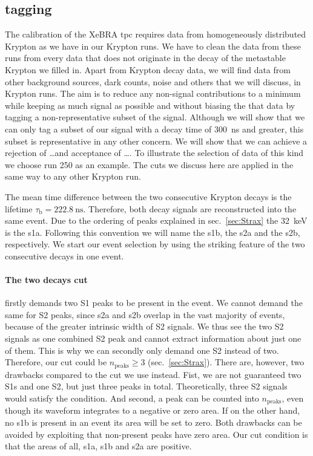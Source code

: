
\FloatBarrier
\subsection{tagging}
\label{ssec:tagging}
\FloatBarrier



The calibration of the XeBRA \gls{tpc} requires data from homogeneously distributed Krypton as we have in our Krypton runs.
We have to clean the data from these runs from every data that does not originate in the decay of the metastable Krypton we filled in.
Apart from Krypton decay data, we will find data from other background sources, dark counts, noise and others that we will discuss, in Krypton runs.
The aim is to reduce any non-signal contributions to a minimum while keeping as much signal as possible and without biasing the that data by tagging a non-representative subset of the signal.
Although we will show that we can only tag a subset of our signal with a decay time of \SI{300}{\nano\s} and greater, this subset is representative in any other concern.
We will show that we can achieve a rejection of \dots and acceptance of \dots.  %
To illustrate the selection of data of this kind we choose run 250 as an example.
The cuts we discuss here are applied in the same way to any other Krypton run.


The mean time difference between the two consecutive Krypton decays is the lifetime $\tau_\mathrm{b} = \SI{222.8}{\nano\s}$.
Therefore, both decay signals are reconstructed into the same event.
Due to the ordering of peaks explained in sec.~\ref{sec:Strax} the \SI{32}{\kilo\eV} is the \gls{s1a}.
Following this convention we will name the \gls{s1b}, the \gls{s2a} and the \gls{s2b}, respectively.
We start our event selection by using the striking feature of the two consecutive decays in one event.


\paragraph{The two decays cut} firstly demands two S1 peaks to be present in the event.
We cannot demand the same for S2 peaks, since \gls{s2a} and \gls{s2b} overlap in the vast majority of events, because of the greater intrinsic width of S2 signals.
We thus see the two S2 signals as one combined S2 peak and cannot extract information about just one of them.
This is why we can secondly only demand one S2 instead of two.
Therefore, our cut could be $n_\mathrm{peaks} \ge 3$ (sec.~\ref{sec:Strax}).
There are, however, two drawbacks compared to the cut we use instead.
Fist, we are not guaranteed two S1s and one S2, but just three peaks in total.
Theoretically, three S2 signals would satisfy the condition.
And second, a peak can be counted into $ n_\mathrm{peaks} $, even though its waveform integrates to a negative or zero area.
If on the other hand, no \gls{s1b} is present in an event its area will be set to zero.
Both drawbacks can be avoided by exploiting that non-present peaks have zero area.
Our cut condition is that the areas of all, \gls{s1a}, \gls{s1b} and \gls{s2a} are positive.

